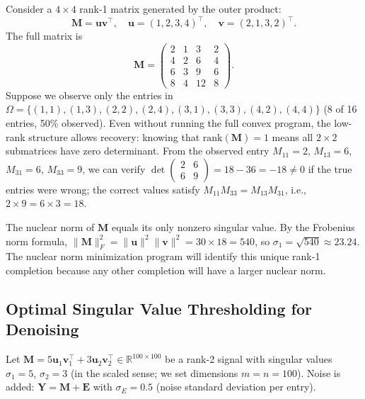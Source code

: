 \documentclass[conference]{IEEEtran}
\begin{document}
Consider a $4 \times 4$ rank-1 matrix generated by the outer product:
\begin{equation}
  \mathbf{M} = \mathbf{u}\mathbf{v}^\top, \quad \mathbf{u} = (1, 2, 3, 4)^\top, \quad \mathbf{v} = (2, 1, 3, 2)^\top.
\end{equation}
The full matrix is
\begin{equation}
  \mathbf{M} = \begin{pmatrix} 2 & 1 & 3 & 2 \\ 4 & 2 & 6 & 4 \\ 6 & 3 & 9 & 6 \\ 8 & 4 & 12 & 8 \end{pmatrix}.
\end{equation}
Suppose we observe only the entries in
$\Omega = \{(1,1),(1,3),(2,2),(2,4),(3,1),(3,3),(4,2),(4,4)\}$ (8 of 16 entries, 50\% observed). Even without running the full convex program, the low-rank structure allows recovery: knowing that $\mathrm{rank}(\mathbf{M}) = 1$ means all $2 \times 2$ submatrices have zero determinant. From the observed entry $M_{11} = 2$, $M_{13} = 6$, $M_{31} = 6$, $M_{33} = 9$, we can verify $\det\begin{pmatrix}2 & 6\\ 6 & 9\end{pmatrix} = 18 - 36 = -18 \neq 0$ if the true entries were wrong; the correct values satisfy $M_{11}M_{33} = M_{13}M_{31}$, i.e., $2 \times 9 = 6 \times 3 = 18$. \checkmark

The nuclear norm of $\mathbf{M}$ equals its only nonzero singular value. By the Frobenius norm formula, $\|\mathbf{M}\|_F^2 = \|\mathbf{u}\|^2\|\mathbf{v}\|^2 = 30 \times 18 = 540$, so $\sigma_1 = \sqrt{540} \approx 23.24$. The nuclear norm minimization program will identify this unique rank-1 completion because any other completion will have a larger nuclear norm.

\subsection{Optimal Singular Value Thresholding for Denoising}

Let $\mathbf{M} = 5\mathbf{u}_1\mathbf{v}_1^\top + 3\mathbf{u}_2\mathbf{v}_2^\top \in \mathbb{R}^{100 \times 100}$ be a rank-2 signal with singular values $\sigma_1 = 5$, $\sigma_2 = 3$ (in the scaled sense; we set dimensions $m = n = 100$). Noise is added: $\mathbf{Y} = \mathbf{M} + \mathbf{E}$ with $\sigma_E = 0.5$ (noise standard deviation per entry).
\end{document}

